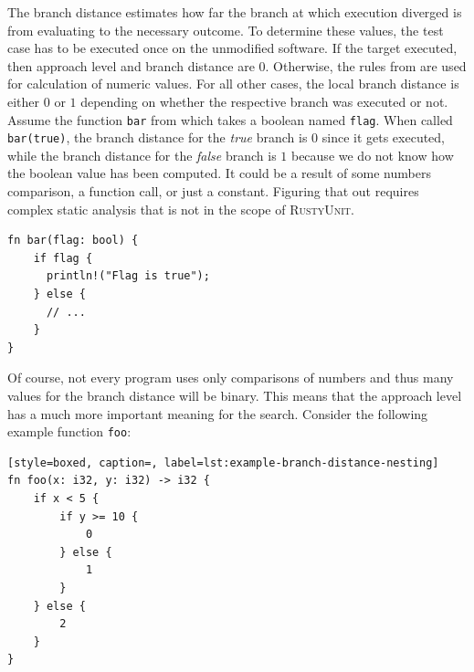 \documentclass[paper=a4,%
  twoside,%
  BCOR4mm,%
  abstract=true,%
  toc=bibliography,%
  chapterprefix=true,%
  toc=bibliographynumbered,%
  open=right,%
  english,%
  pagesize=pdftex]{scrreprt}
\newcommand{\tech}{\textsc{RustyUnit}\xspace}
\begin{document}
The branch distance estimates how far the branch at which execution diverged is from evaluating to the necessary outcome. To determine these values, the test case has to be executed once on the unmodified software. If the target executed, then approach level and branch distance are $0$. Otherwise, the rules from  are used for calculation of numeric values. For all other cases, the local branch distance is either $0$ or $1$ depending on whether the respective branch was executed or not. Assume the function \texttt{bar} from  which takes a boolean named \texttt{flag}. When called \texttt{bar(true)}, the branch distance for the \textit{true} branch is $0$ since it gets executed, while the branch distance for the \textit{false} branch is $1$ because we do not know how the boolean value has been computed. It could be a result of some numbers comparison, a function call, or just a constant. Figuring that out requires complex static analysis that is not in the scope of \tech. 

\begin{lstlisting}[style=boxed, caption={Computation of local branch distance for a boolean flag that we do not know where it came from}, label=lst:example-branch-distance-boolean-flag]
fn bar(flag: bool) {
    if flag {
      println!("Flag is true"); 
    } else {
      // ...
    }
}
\end{lstlisting}

Of course, not every program uses only comparisons of numbers and thus many values for the branch distance will be binary. This means that the approach level has a much more important meaning for the search. Consider the following example function \texttt{foo}:

\begin{lstlisting}[style=boxed, caption=, label=lst:example-branch-distance-nesting]
fn foo(x: i32, y: i32) -> i32 {
    if x < 5 {
        if y >= 10 {
            0
        } else {
            1
        }
    } else {
        2
    }
}
\end{lstlisting}
\end{document}
